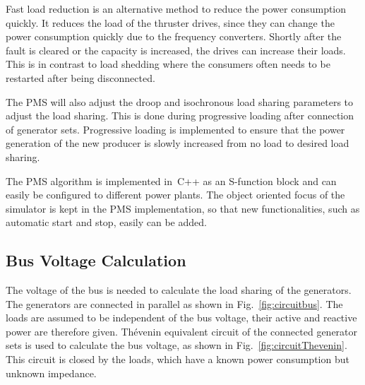 \documentclass[journal]{IEEEtran}
\begin{document}
Fast load reduction is an alternative method to reduce the power consumption quickly.
It reduces the load of the thruster drives, since they can change the power consumption quickly due to the frequency converters.
Shortly after the fault is cleared or the capacity is increased, the drives can increase their loads.
This is in contrast to load shedding where the consumers often needs to be restarted after being disconnected.

The PMS will also adjust the droop and isochronous load sharing parameters to adjust the load sharing.
This is done during progressive loading after connection of generator sets.
Progressive loading is implemented to ensure that the power generation of the new producer is slowly increased from no load to desired load sharing.

The PMS algorithm is implemented in~C++ as an S-function block and can easily be configured to different power plants.
The object oriented focus of the simulator is kept in the PMS implementation, so that new functionalities, such as automatic start and stop, easily can be added.


\subsection{Bus Voltage Calculation}
\label{sec:voltage}
The voltage of the bus is needed to calculate the load sharing of the generators.
The generators are connected in parallel as shown in Fig.~\ref{fig:circuitbus}.
The loads are assumed to be independent of the bus voltage, their active and reactive power are therefore given.
Th\'{e}venin equivalent circuit of the connected generator sets is used to calculate the bus voltage, as shown in Fig.~\ref{fig:circuitThevenin}.
This circuit is closed by the loads, which have a known power consumption but unknown impedance.
\end{document}
